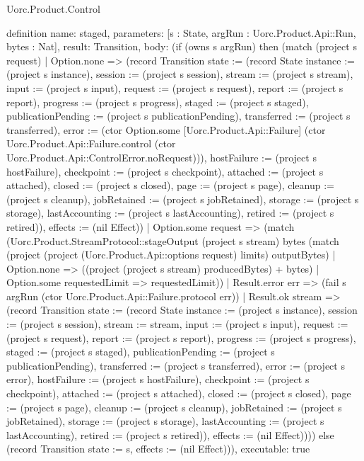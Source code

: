 \begin{lexlean}{Uorc.Product.Control}
\begin{semanticmodule}
definition{
  name: staged,
  parameters: [s : State, argRun : Uorc.Product.Api::Run, bytes : Nat],
  result: Transition,
  body: (if (owns s argRun) then (match (project s request)
    | Option.none => (record Transition {state := (record State {instance := (project s instance), session := (project s session), stream := (project s stream), input := (project s input), request := (project s request), report := (project s report), progress := (project s progress), staged := (project s staged), publicationPending := (project s publicationPending), transferred := (project s transferred), error := (ctor Option.some [Uorc.Product.Api::Failure] (ctor Uorc.Product.Api::Failure.control (ctor Uorc.Product.Api::ControlError.noRequest))), hostFailure := (project s hostFailure), checkpoint := (project s checkpoint), attached := (project s attached), closed := (project s closed), page := (project s page), cleanup := (project s cleanup), jobRetained := (project s jobRetained), storage := (project s storage), lastAccounting := (project s lastAccounting), retired := (project s retired)}), effects := (nil Effect)})
    | Option.some request => (match (Uorc.Product.StreamProtocol::stageOutput (project s stream) bytes (match (project (project (Uorc.Product.Api::options request) limits) outputBytes)
        | Option.none => ((project (project s stream) producedBytes) + bytes)
        | Option.some requestedLimit => requestedLimit))
      | Result.error err => (fail s argRun (ctor Uorc.Product.Api::Failure.protocol err))
      | Result.ok stream => (record Transition {state := (record State {instance := (project s instance), session := (project s session), stream := stream, input := (project s input), request := (project s request), report := (project s report), progress := (project s progress), staged := (project s staged), publicationPending := (project s publicationPending), transferred := (project s transferred), error := (project s error), hostFailure := (project s hostFailure), checkpoint := (project s checkpoint), attached := (project s attached), closed := (project s closed), page := (project s page), cleanup := (project s cleanup), jobRetained := (project s jobRetained), storage := (project s storage), lastAccounting := (project s lastAccounting), retired := (project s retired)}), effects := (nil Effect)}))) else (record Transition {state := s, effects := (nil Effect)})),
  executable: true
}


\end{semanticmodule}
\end{lexlean}
